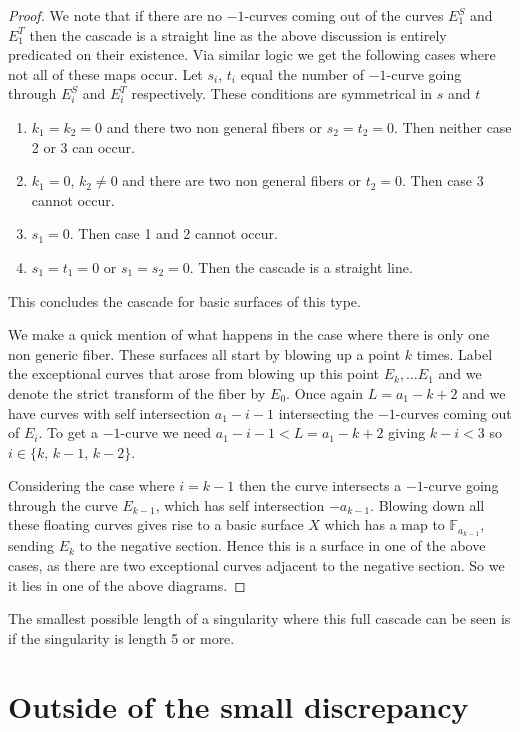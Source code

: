 \documentclass[12pt,a4paper]{book}      %
\theoremstyle{definition}
\newcommand{\mb}[1]{\mathbb{#1}}
\begin{document}
\begin{proof}
We note that if there are no $-1$-curves coming out of the curves $E_1^S$ and $E_1^T$ then the cascade is a straight line as the above discussion is entirely predicated on their existence.
Via similar logic we get the following cases where not all of these maps occur. Let $s_i$, $t_i$ equal the number of $-1$-curve going through $E_i^S$ and $E_i^T$ respectively. These conditions are symmetrical in $s$ and $t$
\begin{enumerate}
\item $k_1 = k_2 = 0$ and there two non general fibers or $s_2 = t_2 = 0$. Then neither case 2 or 3 can occur.

\item $k_1 = 0$, $k_2 \neq 0$ and there are two non general fibers or $t_2 = 0$. Then case 3 cannot occur.

\item $s_1 = 0$. Then case 1 and 2 cannot occur. 

\item $s_1 = t_1 = 0$ or $s_1 = s_2 = 0$. Then the cascade is a straight line. 
\end{enumerate}
This concludes the cascade for basic surfaces of this type. 

We make a quick mention of what happens in the case where there is only one non generic fiber. These surfaces all start by blowing up a point $k$ times. Label the exceptional curves that arose from blowing up this point $E_{k}, \dots E_1$ and we denote the strict transform of the fiber by $E_{0}$. Once again $L = a_1 - k+ 2$ and we have curves with self intersection $a_1 - i -1$ intersecting the $-1$-curves coming out of $E_i$. To get a $-1$-curve we need $a_1 - i - 1 < L = a_1 - k+2$ giving $k-i < 3$ so $i \in \{ k, \, k-1,\, k-2 \}$. 

Considering the case where $i = k-1$ then the curve intersects a $-1$-curve going through the curve $E_{k-1}$, which has self intersection $-a_{k-1}$. Blowing down all these floating curves gives rise to a basic surface $X$ which has a map to $\mb{F}_{a_{k-1}}$, sending $E_k$ to the negative section. Hence this is a surface in one of the above cases, as there are two exceptional curves adjacent to the negative section. So we it lies in one of the above diagrams.
\end{proof}

The smallest possible length of a singularity where this full cascade can be seen is if the singularity is length 5 or more.

\section{Outside of the small discrepancy}
\end{document}
